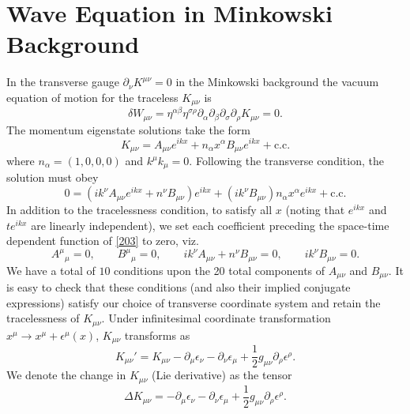 \documentclass[10pt,letterpaper]{article}
\numberwithin{equation}{subsection}
\begin{document}
\section{Wave Equation in Minkowski Background}
In the transverse gauge $\partial_\nu K^{\mu\nu} = 0$ in the Minkowski background the vacuum equation of motion for the traceless $K_{\mu\nu}$ is
\begin{equation}
\delta W_{\mu\nu} = \eta^{\alpha\beta} \eta^{\sigma\rho}\partial_\alpha\partial_\beta\partial_\sigma\partial_\rho K_{\mu\nu} =0.
\end{equation}
The momentum eigenstate solutions take the form 
\begin{equation}
K_{\mu\nu} = A_{\mu\nu}e^{ikx} + n_\alpha x^\alpha B_{\mu\nu} e^{ikx} +\text{c.c.}\label{202}
\end{equation}
where $n_\alpha = (1,0,0,0)$ and $k^\mu k_{\mu} = 0$. Following the transverse condition, the solution must obey
\begin{equation}
0=\left(ik^\nu A_{\mu\nu}e^{ikx} + n^\nu B_{\mu\nu}\right)e^{ikx}
+ \left( ik^\nu B_{\mu\nu}\right) n_\alpha x^\alpha  e^{ikx}+ \text{c.c.}\label{203}
\end{equation}
In addition to the tracelessness condition, to satisfy all $x$ (noting that $e^{ikx}$ and $te^{ikx}$ are linearly independent), we set each coefficient preceding the space-time dependent function of \eqref{203} to zero, viz.
\begin{equation}
A^\mu{}_\mu = 0,\qquad B^\mu{}_\mu=0,\qquad ik^\nu A_{\mu\nu} + n^\nu B_{\mu\nu}= 0,\qquad i k^\nu B_{\mu\nu} = 0.
\end{equation}
We have a total of $10$ conditions upon the 20 total components of $A_{\mu\nu}$ and $B_{\mu\nu}$. 
It is easy to check that these conditions (and also their implied conjugate expressions) satisfy our choice of transverse coordinate system and retain the tracelessness of $K_{\mu\nu}$. 
Under infinitesimal coordinate transformation $x^\mu \to x^\mu + \epsilon^\mu(x)$, $K_{\mu\nu}$ transforms as
\begin{equation}
	K_{\mu\nu}' = K_{\mu\nu} - \partial_\mu \epsilon_\nu - \partial_\nu\epsilon_\mu + \frac12 g_{\mu\nu} \partial_\rho \epsilon^\rho.
\end{equation}
We denote the change in $K_{\mu\nu}$ (Lie derivative) as the tensor
\begin{equation}
\Delta K_{\mu\nu} = - \partial_\mu \epsilon_\nu - \partial_\nu\epsilon_\mu + \frac12 g_{\mu\nu} \partial_\rho \epsilon^\rho.\label{207}
\end{equation}
\end{document}
